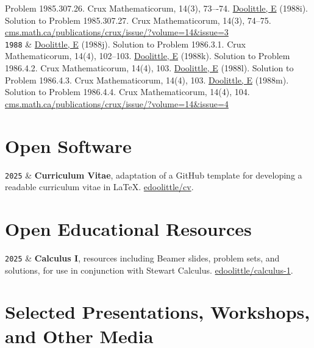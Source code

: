 \documentclass[9pt,a4paper]{article}
\newcommand{\LastName}{Doolittle}
\newcommand{\Initials}{E}
\newcommand{\Me}{\underline{\LastName, \Initials}}  %
\newcommand{\Year}[1]{\fontsize{10pt}{0}\selectfont \texttt{#1}}
\newcommand{\Website}[1]{\href{https://#1}{#1}}
\newcommand{\GitHub}[1]{\faGithub{} \href{https://github.com/#1}{#1}}
\begin{document}
\begin{EntriesTableYear}
  Problem 1985.307.26.  Crux Mathematicorum, 14(3), 73–-74.  \newline
  \Me{} (1988i).  Solution to Problem 1985.307.27.  Crux
  Mathematicorum, 14(3), 74--75.
  \newline %
  \Website{cms.math.ca/publications/crux/issue/?volume=14\&issue=3}
  \\
  \Year{1988} & \Me{} (1988j).  Solution to Problem 1986.3.1.  Crux
  Mathematicorum, 14(4), 102--103.  \newline \Me{} (1988k).  Solution
  to Problem 1986.4.2.  Crux Mathematicorum, 14(4), 103.  \newline
  \Me{} (1988l).  Solution to Problem 1986.4.3.  Crux Mathematicorum,
  14(4), 103.  \newline \Me{} (1988m).  Solution to Problem 1986.4.4.
  Crux Mathematicorum, 14(4), 104.
  \newline %
  \Website{cms.math.ca/publications/crux/issue/?volume=14\&issue=4}
\end{EntriesTableYear}
      
\section{Open Software}

\begin{EntriesTableYear}
  \Year{2025} & \textbf{Curriculum Vitae}, adaptation of a GitHub
  template for developing a readable curriculum vitae in \LaTeX.
  \GitHub{edoolittle/cv}.
\end{EntriesTableYear}

\section{Open Educational Resources}

\begin{EntriesTableYear}
  \Year{2025} & \textbf{Calculus I}, resources including Beamer
  slides, problem sets, and solutions, for use in conjunction with
  Stewart Calculus.  \GitHub{edoolittle/calculus-1}.
\end{EntriesTableYear}

\section{Selected Presentations, Workshops, and Other Media}
\end{document}
